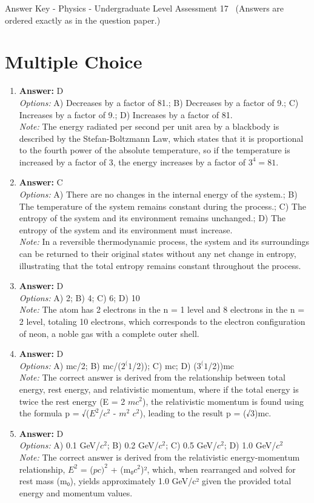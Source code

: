 \documentclass[12pt]{article}
\begin{document}
\begin{center}
Answer Key - Physics - Undergraduate Level Assessment 17 \
\small (Answers are ordered exactly as in the question paper.)
\end{center}

\section*{Multiple Choice}
\begin{enumerate}[label=\arabic*.]
\item \textbf{Answer:} D
\\ \textit{Options:} A) Decreases by a factor of 81.; B) Decreases by a factor of 9.; C) Increases by a factor of 9.; D) Increases by a factor of 81.
\\ \textit{Note:} The energy radiated per second per unit area by a blackbody is described by the Stefan-Boltzmann Law, which states that it is proportional to the fourth power of the absolute temperature, so if the temperature is increased by a factor of 3, the energy increases by a factor of \(3^4 = 81\).
\item \textbf{Answer:} C
\\ \textit{Options:} A) There are no changes in the internal energy of the system.; B) The temperature of the system remains constant during the process.; C) The entropy of the system and its environment remains unchanged.; D) The entropy of the system and its environment must increase.
\\ \textit{Note:} In a reversible thermodynamic process, the system and its surroundings can be returned to their original states without any net change in entropy, illustrating that the total entropy remains constant throughout the process.
\item \textbf{Answer:} D
\\ \textit{Options:} A) 2; B) 4; C) 6; D) 10
\\ \textit{Note:} The atom has 2 electrons in the n = 1 level and 8 electrons in the n = 2 level, totaling 10 electrons, which corresponds to the electron configuration of neon, a noble gas with a complete outer shell.
\item \textbf{Answer:} D
\\ \textit{Options:} A) mc/2; B) mc/($2^(1$/2)); C) mc; D) ($3^(1$/2))mc
\\ \textit{Note:} The correct answer is derived from the relationship between total energy, rest energy, and relativistic momentum, where if the total energy is twice the rest energy (E = 2 $mc^2$), the relativistic momentum is found using the formula p = √($E^2$/$c^2$ - $m^2$ $c^2$), leading to the result p = (√3)mc.
\item \textbf{Answer:} D
\\ \textit{Options:} A) 0.1 GeV/$c^2$; B) 0.2 GeV/$c^2$; C) 0.5 GeV/$c^2$; D) 1.0 GeV/$c^2$
\\ \textit{Note:} The correct answer is derived from the relativistic energy-momentum relationship, $E^2$ = ($pc)^2$ + (m₀$c^2$)², which, when rearranged and solved for rest mass (m₀), yields approximately 1.0 GeV/c² given the provided total energy and momentum values.
\end{enumerate}
\end{document}
